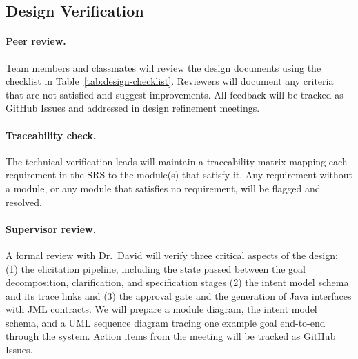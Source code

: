\documentclass[12pt, titlepage]{article}
\begin{document}
\subsection{Design Verification}




\paragraph{Peer review.}
Team members and classmates will review the design documents using the
checklist in Table~\ref{tab:design-checklist}. Reviewers will document
any criteria that are not satisfied and suggest improvements. All
feedback will be tracked as GitHub Issues and addressed in design
refinement meetings.

\paragraph{Traceability check.}
The technical verification leads will maintain a traceability matrix
mapping each requirement in the SRS to the module(s) that satisfy it.
Any requirement without a module, or any module that satisfies no
requirement, will be flagged and resolved.

\paragraph{Supervisor review.}
A formal review with Dr.\ David will verify three critical aspects of the
design: (1) the elicitation pipeline, including the state passed between
the goal decomposition, clarification, and specification stages (2) the
intent model schema and its trace links and (3) the approval gate and
the generation of Java interfaces with JML contracts. We will prepare a
module diagram, the intent model schema, and a UML sequence diagram
tracing one example goal end-to-end through the system. Action items
from the meeting will be tracked as GitHub Issues.
\end{document}
